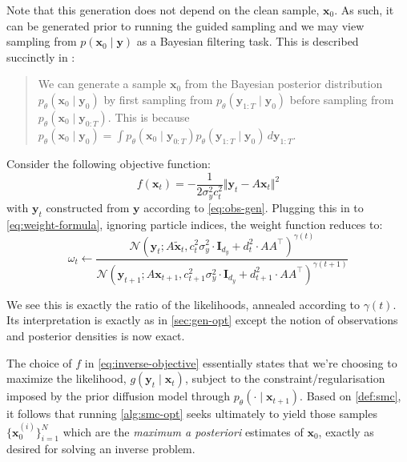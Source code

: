 Note that this generation does not depend on the clean sample, $\mathbf{x}_0$. As such,
it can be generated prior to running the guided sampling and we may view sampling from
$p(\mathbf{x}_0 \mid \mathbf{y})$ as a Bayesian filtering task. This is described succinctly in
\textcite{douDiffusionPosteriorSampling2023}:
\begin{quote}
    We can generate a sample $\mathbf{x}_0$ from the Bayesian posterior distribution
    $p_\theta(\mathbf{x}_0 \mid \mathbf{y}_0)$ by first sampling from
    $p_\theta(\mathbf{y}_{1:T} \mid \mathbf{y}_0)$ before sampling from
    $p_\theta(\mathbf{x}_0 \mid \mathbf{y}_{0:T})$. This is because
    $p_\theta(\mathbf{x}_0 \mid \mathbf{y}_0) = \int p_\theta(\mathbf{x}_0 \mid \mathbf{y}_{0:T})p_\theta(\mathbf{y}_{1:T} \mid \mathbf{y}_0)\, d\mathbf{y}_{1:T}$.
\end{quote}

\begin{proposition}
    Consider the following objective function:
    \begin{equation}
        f(\mathbf{x}_t) = -\frac{1}{2\sigma_y^2c_t^2}\Vert\mathbf{y}_t - A\mathbf{x}_t\Vert^2 \label{eq:inverse-objective}
    \end{equation}
    with $\mathbf{y}_t$ constructed from $\mathbf{y}$ according to \autoref{eq:obs-gen}.
    Plugging this in to \autoref{eq:weight-formula}, ignoring particle indices, the weight function
    reduces to:
    \begin{equation}
        \omega_t \gets \frac{\mathcal{N}(\mathbf{y}_t; A\tilde{\mathbf{x}}_t, c_t^2\sigma_y^2\cdot \mathbf{I}_{d_y} + d_t^2\cdot AA^\top)^{\gamma(t)}}{\mathcal{N}(\mathbf{y}_{t+1}; A\mathbf{x}_{t+1}, c_{t+1}^2\sigma_y^2\cdot \mathbf{I}_{d_y} + d_{t+1}^2\cdot AA^\top)^{\gamma(t+1)}} \label{eq:weight-formula-inverse}
    \end{equation}
\end{proposition}

We see this is exactly the ratio of the likelihoods, annealed according to $\gamma(t)$. Its
interpretation is exactly as in \autoref{sec:gen-opt} except the notion of observations and posterior
densities is now exact.

\begin{remark}[MAP]
    The choice of $f$ in \autoref{eq:inverse-objective} essentially states that
    we're choosing to maximize the likelihood, $g(\mathbf{y}_t \mid \mathbf{x}_t)$, subject to the
    constraint/regularisation imposed by the prior diffusion model through
    $p_\theta(\cdot \mid \mathbf{x}_{t+1})$. Based on \ref{def:smc}, it follows that running
    \autoref{alg:smc-opt} seeks ultimately to yield those samples $\{\mathbf{x}_0^{(i)}\}_{i=1}^N$
    which are the \emph{maximum a posteriori} estimates of $\mathbf{x}_0$, exactly as desired for
    solving an inverse problem.
\end{remark}

